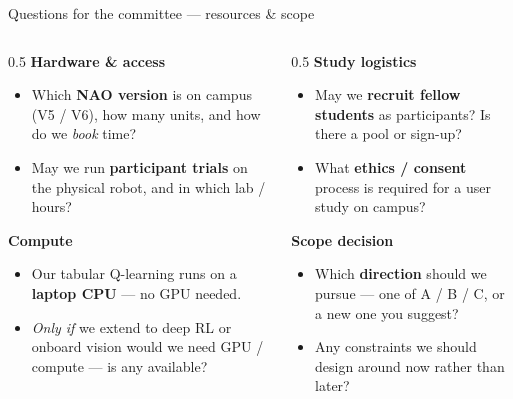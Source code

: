 \documentclass[aspectratio=169,10pt]{beamer}
\begin{document}
\begin{frame}{Questions for the committee --- resources \& scope}
  \begin{columns}[T]
    \begin{column}{0.5\textwidth}
      \textbf{Hardware \& access}
      \begin{itemize}\footnotesize
        \item Which \textbf{NAO version} is on campus (V5 / V6), how many units, and how do we \emph{book} time?
        \item May we run \textbf{participant trials} on the physical robot, and in which lab / hours?
      \end{itemize}
      \medskip
      \textbf{Compute}
      \begin{itemize}\footnotesize
        \item Our tabular Q-learning runs on a \textbf{laptop CPU} --- no GPU needed.
        \item \emph{Only if} we extend to \alert{deep RL} or onboard vision would we need GPU / compute --- is any available?
      \end{itemize}
    \end{column}
    \begin{column}{0.5\textwidth}
      \textbf{Study logistics}
      \begin{itemize}\footnotesize
        \item May we \textbf{recruit fellow students} as participants? Is there a pool or sign-up?
        \item What \textbf{ethics / consent} process is required for a user study on campus?
      \end{itemize}
      \medskip
      \textbf{Scope decision}
      \begin{itemize}\footnotesize
        \item Which \textbf{direction} should we pursue --- one of A / B / C, or a new one you suggest?
        \item Any constraints we should design around now rather than later?
      \end{itemize}
    \end{column}
  \end{columns}
\end{frame}
\end{document}
